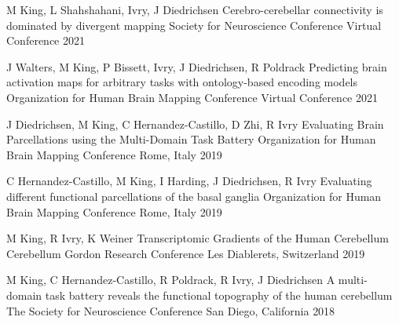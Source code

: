 

\begin{cventries}

  \cventry
    {M King, L Shahshahani, Ivry, J Diedrichsen} %
    {Cerebro-cerebellar connectivity is dominated by divergent mapping} %
    {Society for Neuroscience Conference} %
    {Virtual Conference} %
    {2021} %

  \cventry
    {J Walters, M King, P Bissett,  Ivry, J Diedrichsen, R Poldrack} %
    {Predicting brain activation maps for arbitrary tasks with ontology-based encoding models} %
    {Organization for Human Brain Mapping Conference} %
    {Virtual Conference} %
    {2021} %

  \cventry
    {J Diedrichsen, M King, C Hernandez-Castillo, D Zhi, R Ivry} %
    {Evaluating Brain Parcellations using the Multi-Domain Task Battery} %
    {Organization for Human Brain Mapping Conference} %
    {Rome, Italy} %
    {2019} %
    
  \cventry
    {C Hernandez-Castillo, M King, I Harding, J Diedrichsen, R Ivry} %
    {Evaluating different functional parcellations of the basal ganglia} %
    {Organization for Human Brain Mapping Conference} %
    {Rome, Italy} %
    {2019} %
    
  \cventry
    {M King, R Ivry, K Weiner} %
    {Transcriptomic Gradients of the Human Cerebellum} %
    {Cerebellum Gordon Research Conference} %
    {Les Diablerets, Switzerland} %
    {2019} %
    
  \cventry
    {M King, C Hernandez-Castillo, R Poldrack, R Ivry, J Diedrichsen} %
    {A multi-domain task battery reveals the functional topography of the human cerebellum} %
    {The Society for Neuroscience Conference} %
    {San Diego, California} %
    {2018} %


\end{cventries}

